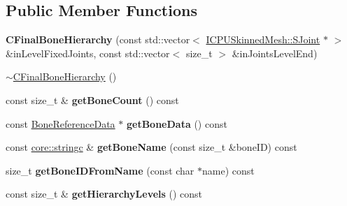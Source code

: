 \subsection*{Public Member Functions}
\begin{DoxyCompactItemize}
\item 
{\bfseries C\+Final\+Bone\+Hierarchy} (const std\+::vector$<$ \hyperlink{classirr_1_1scene_1_1ICPUSkinnedMesh_1_1SJoint}{I\+C\+P\+U\+Skinned\+Mesh\+::\+S\+Joint} $\ast$ $>$ \&in\+Level\+Fixed\+Joints, const std\+::vector$<$ size\+\_\+t $>$ \&in\+Joints\+Level\+End)\hypertarget{classirr_1_1scene_1_1CFinalBoneHierarchy_ac8858e4e16cf973516650dc48b638ceb}{}\label{classirr_1_1scene_1_1CFinalBoneHierarchy_ac8858e4e16cf973516650dc48b638ceb}

\item 
\hyperlink{classirr_1_1scene_1_1CFinalBoneHierarchy_a7e20b6ecb0668954ecc1f279f6e02006}{$\sim$\+C\+Final\+Bone\+Hierarchy} ()
\item 
const size\+\_\+t \& {\bfseries get\+Bone\+Count} () const \hypertarget{classirr_1_1scene_1_1CFinalBoneHierarchy_ae267cac421c80aa9d087e0b3f1a0ce89}{}\label{classirr_1_1scene_1_1CFinalBoneHierarchy_ae267cac421c80aa9d087e0b3f1a0ce89}

\item 
const \hyperlink{structirr_1_1scene_1_1CFinalBoneHierarchy_1_1BoneReferenceData}{Bone\+Reference\+Data} $\ast$ {\bfseries get\+Bone\+Data} () const \hypertarget{classirr_1_1scene_1_1CFinalBoneHierarchy_a320196a123686ee5bd9e7aff3d6dc09c}{}\label{classirr_1_1scene_1_1CFinalBoneHierarchy_a320196a123686ee5bd9e7aff3d6dc09c}

\item 
const \hyperlink{namespaceirr_1_1core_ade1071a878633f2f6d8a75c5d11fec19}{core\+::stringc} \& {\bfseries get\+Bone\+Name} (const size\+\_\+t \&bone\+ID) const \hypertarget{classirr_1_1scene_1_1CFinalBoneHierarchy_a2f1a515e0107f75bc7674ab02d359751}{}\label{classirr_1_1scene_1_1CFinalBoneHierarchy_a2f1a515e0107f75bc7674ab02d359751}

\item 
size\+\_\+t {\bfseries get\+Bone\+I\+D\+From\+Name} (const char $\ast$name) const \hypertarget{classirr_1_1scene_1_1CFinalBoneHierarchy_a4de13716f8fe16db7469ac2463a1b26f}{}\label{classirr_1_1scene_1_1CFinalBoneHierarchy_a4de13716f8fe16db7469ac2463a1b26f}

\item 
const size\+\_\+t \& {\bfseries get\+Hierarchy\+Levels} () const \hypertarget{classirr_1_1scene_1_1CFinalBoneHierarchy_af9ec96fc70811d08704f37ebca442b3a}{}\label{classirr_1_1scene_1_1CFinalBoneHierarchy_af9ec96fc70811d08704f37ebca442b3a}


\end{DoxyCompactItemize}
